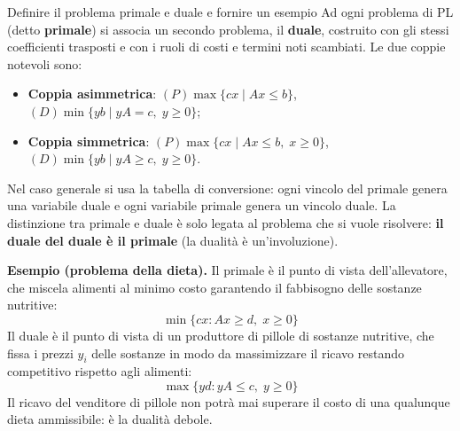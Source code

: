 \documentclass[12pt]{extarticle} %
\begin{document}
\begin{teoriabox}{Definire il problema primale e duale e fornire un esempio}
Ad ogni problema di PL (detto \textbf{primale}) si associa un secondo problema, il \textbf{duale}, costruito con gli stessi coefficienti trasposti e con i ruoli di costi e termini noti scambiati. Le due coppie notevoli sono:
\begin{itemize}
    \item \textbf{Coppia asimmetrica}: $(P) \max\{cx \mid Ax \le b\}$, $(D) \min\{yb \mid yA = c, \; y \ge 0\}$;
    \item \textbf{Coppia simmetrica}: $(P) \max\{cx \mid Ax \le b, \; x\ge 0\}$, $(D) \min\{yb \mid yA \ge c, \; y \ge 0\}$.
\end{itemize}
Nel caso generale si usa la tabella di conversione: ogni vincolo del primale genera una variabile duale e ogni variabile primale genera un vincolo duale. La distinzione tra primale e duale è solo legata al problema che si vuole risolvere: \textbf{il duale del duale è il primale} (la dualità è un'involuzione).

\noindent\textbf{Esempio (problema della dieta).} Il primale è il punto di vista dell'allevatore, che miscela alimenti al minimo costo garantendo il fabbisogno delle sostanze nutritive:
\[
\min\{cx : Ax \ge d, \; x \ge 0\}
\]
Il duale è il punto di vista di un produttore di pillole di sostanze nutritive, che fissa i prezzi $y_i$ delle sostanze in modo da massimizzare il ricavo restando competitivo rispetto agli alimenti:
\[
\max\{yd : yA \le c, \; y \ge 0\}
\]
Il ricavo del venditore di pillole non potrà mai superare il costo di una qualunque dieta ammissibile: è la dualità debole.
\end{teoriabox}
\end{document}
